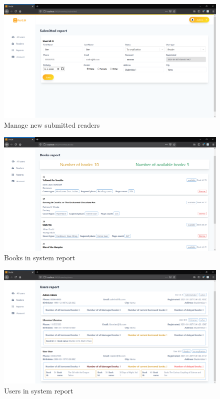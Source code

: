 \begin{figure}[H]
    \centering
    \includegraphics[width=\textwidth]{Include/Resources/FrontendScreens/React/adminSubmittedReport.png}
    \caption{Manage new submitted readers}
    \label{fig:ScreenshotGUIadminSubmittedReport}
\end{figure}




\begin{figure}[H]
    \centering
    \includegraphics[width=\textwidth]{Include/Resources/FrontendScreens/React/adminBooksReports.png}
    \caption{Books in system report}
    \label{fig:ScreenshotGUIadminBooksReports}
\end{figure}




\begin{figure}[H]
    \centering
    \includegraphics[width=\textwidth]{Include/Resources/FrontendScreens/React/adminUsersReport.png}
    \caption{Users in system report}
    \label{fig:ScreenshotGUIadminUsersReport}
\end{figure}



